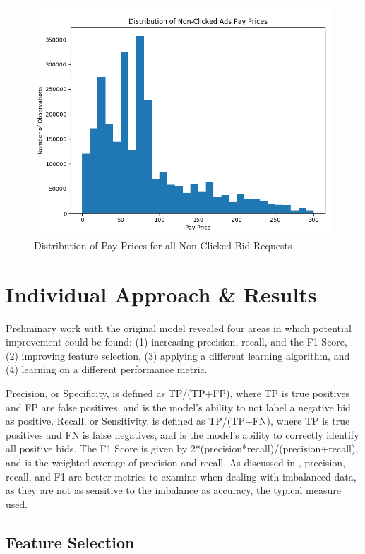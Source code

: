 \documentclass{sig-alternate-05-2015}
\begin{document}
\begin{figure}
\begin {minipage}{0.5\textwidth}
     \centering
     \includegraphics[width=1\textwidth]{payPriceDistNonClicked.png}
     \caption{Distribution of Pay Prices for all Non-Clicked Bid Requests}
     \label{payPriceDistNonClicked}
   \end{minipage}
\end{figure}

\section{Individual  Approach \& Results} \label{approach}
Preliminary work with the original model revealed four areas in which potential improvement could be found: (1) increasing precision, recall, and the F1 Score, (2) improving feature selection, (3) applying a different learning algorithm, and (4) learning on a different performance metric.

Precision, or Specificity, is defined as TP/(TP+FP), where TP is true positives and FP are false positives, and is the model's ability to not label a negative bid as positive.  Recall, or Sensitivity, is defined as TP/(TP+FN), where TP is true positives and FN is false negatives, and is the model's ability to correctly identify all positive bids. The F1 Score is given by 2*(precision*recall)/(precision+recall), and is the weighted average of precision and recall. As discussed in \cite{imbalanced}, precision, recall, and F1 are better metrics to examine when dealing with imbalanced data, as they are not as sensitive to the imbalance as accuracy, the typical measure used.

\subsection{Feature Selection}
\end{document}
